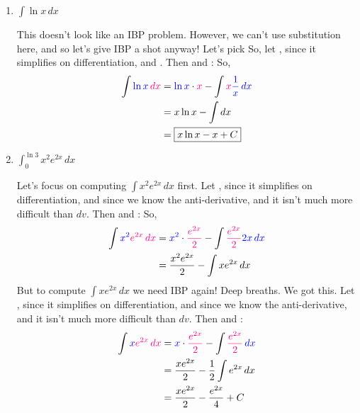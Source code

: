 \documentclass[main]{subfiles}
\begin{document}
\begin{enumerate}
\begin{enumerate}
\begin{solution}
  \end{solution}

\item 
  \begin{problem} [\vfill]
    $\displaystyle \int \ln x \,dx$
  \end{problem}

  \begin{solution}
    This doesn't look like an IBP problem. However, we can't use substitution here, and so let's give IBP a shot anyway! Let's pick So,  let , since it simplifies on differentiation, and . Then  and   :  
     So,
      \begin{align*}
 \int \sub{\ln x} \,\subd{dx} &=
      \sub{\ln x} \cdot \subd{x} - \int \subd{x} \sub{\frac{1}{x}} \, \sub{dx}\\
      &= x \ln x - \int dx \\
            & = \boxed{x \ln x - x + C}
    \end{align*}
  
  \end{solution}


\item 
  \begin{problem} [\vfill] 
    $\displaystyle \int_{0}^{\ln 3} x^2 e^{2x}\,dx$
  \end{problem}

  \begin{solution}
  Let's focus on computing $\displaystyle \int x^2 e^{2x}\,dx$ first. 
     Let , since it simplifies on differentiation, and  since we know the anti-derivative, and it isn't much more difficult than $dv$. Then  and   :  
     So,
      \begin{align*}
        \int \sub{x^2} \subd{e^{2x}} \, \subd{dx}  & =  \sub{x^2}\cdot \subd{\frac{e^{2x}}{2}} - \int \subd{\frac{e^{2x}}{2}} \sub{2x}\, \sub{dx} \\
        & =   \frac{x^2e^{2x}}{2} - \int xe^{2x} \, dx
      \end{align*}    
      But to compute $\displaystyle  \int xe^{2x} \, dx$ we need IBP again! Deep breaths. We got this. Let , since it simplifies on differentiation, and  since we know the anti-derivative, and it isn't much more difficult than $dv$. Then  and   :  
       \begin{align*}
        \int \sub{x} \subd{e^{2x}} \, \subd{dx}  & =  \sub{x}\cdot \subd{\frac{e^{2x}}{2}} - \int \subd{\frac{e^{2x}}{2}}\, \sub{dx} \\
        & =   \frac{xe^{2x}}{2} - \frac{1}{2}\int e^{2x} \, dx \\
        &=  \frac{xe^{2x}}{2} - \frac{e^{2x}}{4} + C
      \end{align*}    
      

\end{solution}
\end{enumerate}
\end{enumerate}
\end{document}
